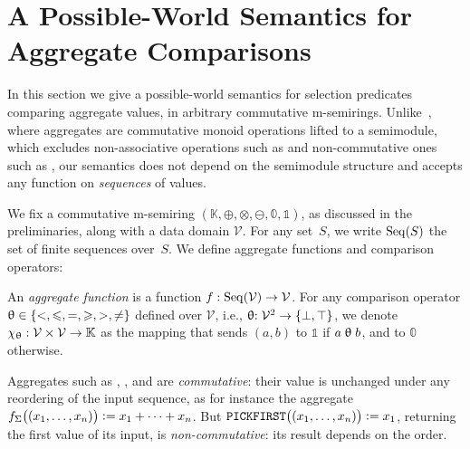 \section{A Possible-World Semantics for Aggregate Comparisons}
\label{sec:semantics}

In this section we give a possible-world semantics for selection
predicates comparing aggregate values, in arbitrary commutative
m-semirings. Unlike~\cite{amsterdamer2011provenance}, where aggregates
are commutative monoid operations lifted to a semimodule, which excludes
non-associative operations such as  and non-commutative ones
such as , our semantics does not depend on the
semimodule structure and accepts any function on \emph{sequences} of
values.

We fix a commutative m-semiring
$(\mathbb{K},\oplus,\otimes,\ominus,\mathbb{0},\mathbb{1})$, as discussed in the preliminaries, along with a data domain $\mathcal{V}$.
For any set~$S$, we write $\mathrm{Seq}(S)$ the set of finite sequences over~$S$.
We define aggregate functions and comparison operators:
\begin{definition}
An \emph{aggregate function} is a function  $f:\mathrm{Seq}(\mathcal{V})\to\mathcal{V}$.
  For any comparison operator ${\mathrel{\uptheta}}\in\{<,\leqslant,=,\geqslant,>,\neq\}$ defined
  over $\mathcal{V}$, i.e., $\mathrel{\uptheta}: \mathcal{V}^2\rightarrow
  \{\bot,\top\}$, we denote
\(
  \chi_{\mathrel{\uptheta}}:\mathcal{V}\times\mathcal{V}\to \mathbb{K}
  \) as the mapping that sends $(a,b)$ to $\mathbb{1}$ if $a\mathrel{\uptheta} b$, and to
  $\mathbb{0}$ otherwise.
\end{definition}

\begin{example}\label{ex:aggregates}
Aggregates such as , ,  and 
are \emph{commutative}: their value is unchanged under any reordering of
the input sequence, as for instance the  aggregate
$f_\Sigma\bigl((x_1,\dots,x_n)\bigr)\mathrel{\mathop:}= x_1+\dots+x_n$.
But
$\texttt{PICKFIRST}\bigl((x_1,\dots,x_n)\bigr)\mathrel{\mathop:}= x_1$, returning
the first value of its input, is \emph{non-commutative}: its result
depends on the order.
\end{example}

